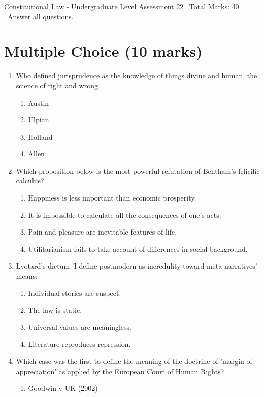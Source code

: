 \documentclass[12pt]{article}
\begin{document}
\begin{center}
Constitutional Law - Undergraduate Level Assessment 22 \
Total Marks: 40 \
Answer all questions.
\end{center}

\section*{Multiple Choice (10 marks)}
\begin{enumerate}[label=\arabic*.]
\item Who defined jurisprudence as the knowledge of things divine and human, the science of right and wrong
\begin{enumerate}[label=(\alph*)]
    \item Austin
    \item Ulpian
    \item Holland
    \item Allen
\end{enumerate}
\item Which proposition below is the most powerful refutation of Bentham's felicific calculus?
\begin{enumerate}[label=(\alph*)]
    \item Happiness is less important than economic prosperity.
    \item It is impossible to calculate all the consequences of one's acts.
    \item Pain and pleasure are inevitable features of life.
    \item Utilitarianism fails to take account of differences in social background.
\end{enumerate}
\item Lyotard's dictum 'I define postmodern as incredulity toward meta-narratives' means:
\begin{enumerate}[label=(\alph*)]
    \item Individual stories are suspect.
    \item The law is static.
    \item Universal values are meaningless.
    \item Literature reproduces repression.
\end{enumerate}
\item Which case was the first to define the meaning of the doctrine of 'margin of appreciation' as applied by the European Court of Human Rights?
\begin{enumerate}[label=(\alph*)]
    \item Goodwin v UK (2002)

\end{enumerate}
\end{enumerate}
\end{document}
